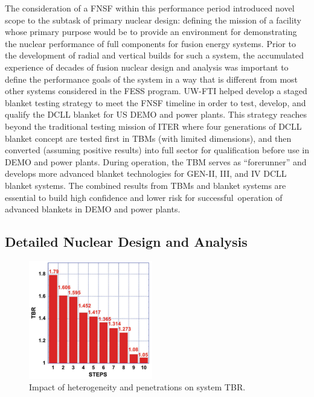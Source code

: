 The consideration of a \gls{FNSF} within this performance period introduced
novel scope to the subtask of primary nuclear design: defining the mission of
a facility whose primary purpose would be to provide an environment for
demonstrating the nuclear performance of full components for fusion energy
systems.  Prior to the development of radial and vertical builds for such a
system, the accumulated experience of decades of fusion nuclear design and
analysis was important to define the performance goals of the system in a way
that is different from most other systems considered in the \gls{FESS}
program.  \gls{UW-FTI} helped develop a staged blanket testing strategy to
meet the \gls{FNSF} timeline in order to test, develop, and qualify the
\gls{DCLL} blanket for US DEMO and power plants. This strategy reaches beyond
the traditional testing mission of ITER where four generations of \gls{DCLL}
blanket concept are tested first in \glspl{TBM} (with limited dimensions), and
then converted (assuming positive results) into full sector for qualification
before use in DEMO and power plants. During operation, the \gls{TBM} serves as
“forerunner” and develops more advanced blanket technologies for GEN-II, III,
and IV \gls{DCLL} blanket systems.  The combined results from \glspl{TBM} and
blanket systems are essential to build high confidence and lower risk for
successful operation of advanced blankets in DEMO and power plants.

\subsection{Detailed Nuclear Design and Analysis}

\begin{figure}
\centering
\includegraphics[width=0.48\textwidth]{imgs/aries-act-2-tbr.png}
\caption{\label{fig:aries-act-2-tbr}Impact of heterogeneity and penetrations on system \gls{TBR}.}
\end{figure}

